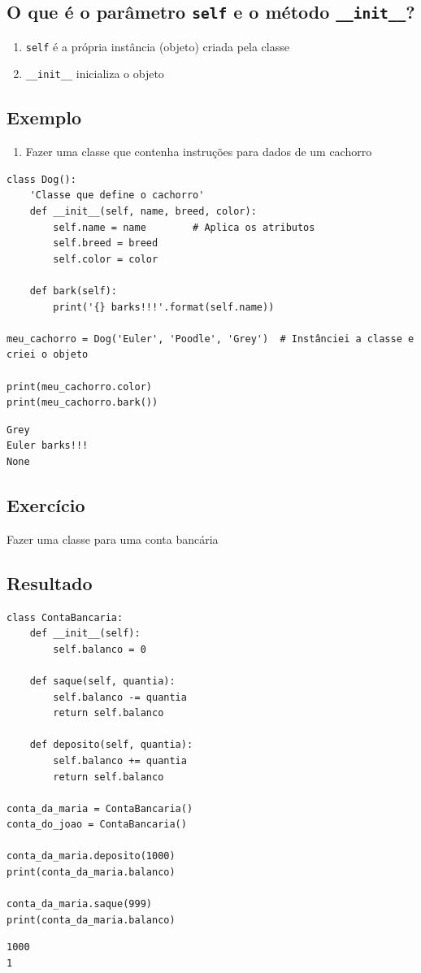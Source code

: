 \documentclass[presentation]{beamer}
\begin{document}
\subsection{O que é o parâmetro \texttt{self} e o método \texttt{\_\_init\_\_}?}
\label{sec:orgheadline47}

\begin{enumerate}
\item \texttt{self} é a própria instância (objeto) criada pela classe
\item \texttt{\_\_init\_\_} inicializa o objeto
\end{enumerate}
\subsection{Exemplo}
\label{sec:orgheadline48}

\begin{enumerate}
\item Fazer uma classe que contenha instruções para dados de um cachorro
\end{enumerate}

\begin{verbatim}
class Dog():
    'Classe que define o cachorro'
    def __init__(self, name, breed, color):
        self.name = name        # Aplica os atributos
        self.breed = breed
        self.color = color

    def bark(self):
        print('{} barks!!!'.format(self.name))

meu_cachorro = Dog('Euler', 'Poodle', 'Grey')  # Instânciei a classe e criei o objeto

print(meu_cachorro.color)
print(meu_cachorro.bark())
\end{verbatim}

\begin{verbatim}
Grey
Euler barks!!!
None
\end{verbatim}

\subsection{Exercício}
\label{sec:orgheadline49}

Fazer uma classe para uma conta bancária
\subsection{Resultado}
\label{sec:orgheadline50}

\begin{verbatim}
class ContaBancaria:
    def __init__(self):
        self.balanco = 0

    def saque(self, quantia):
        self.balanco -= quantia
        return self.balanco

    def deposito(self, quantia):
        self.balanco += quantia
        return self.balanco

conta_da_maria = ContaBancaria()
conta_do_joao = ContaBancaria()

conta_da_maria.deposito(1000)
print(conta_da_maria.balanco)

conta_da_maria.saque(999)
print(conta_da_maria.balanco)
\end{verbatim}

\begin{verbatim}
1000
1
\end{verbatim}
\end{document}
